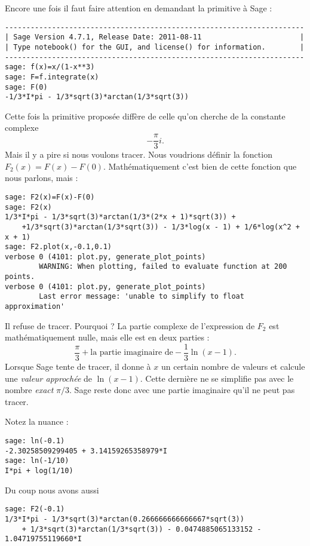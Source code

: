 \begin{example}
	Encore une fois il faut faire attention en demandant la primitive à Sage :
	\begin{verbatim}
----------------------------------------------------------------------
| Sage Version 4.7.1, Release Date: 2011-08-11                       |
| Type notebook() for the GUI, and license() for information.        |
----------------------------------------------------------------------
sage: f(x)=x/(1-x**3)
sage: F=f.integrate(x)
sage: F(0)
-1/3*I*pi - 1/3*sqrt(3)*arctan(1/3*sqrt(3))
\end{verbatim}
	Cette fois la primitive proposée diffère de celle qu'on cherche de la constante complexe
	\begin{equation}
		-\frac{ \pi }{ 3 }i.
	\end{equation}
	Mais il y a pire si nous voulons tracer. Nous voudrions définir la fonction \( F_2(x)=F(x)-F(0)\). Mathématiquement c'est bien de cette fonction que nous parlons, mais :
	\begin{verbatim}
sage: F2(x)=F(x)-F(0)
sage: F2(x)
1/3*I*pi - 1/3*sqrt(3)*arctan(1/3*(2*x + 1)*sqrt(3)) +
    +1/3*sqrt(3)*arctan(1/3*sqrt(3)) - 1/3*log(x - 1) + 1/6*log(x^2 + x + 1)
sage: F2.plot(x,-0.1,0.1)
verbose 0 (4101: plot.py, generate_plot_points) 
        WARNING: When plotting, failed to evaluate function at 200 points.
verbose 0 (4101: plot.py, generate_plot_points) 
        Last error message: 'unable to simplify to float approximation'
\end{verbatim}
	Il refuse de tracer. Pourquoi ? La partie complexe de l'expression de \( F_2\) est mathématiquement nulle, mais elle est en deux parties :
	\begin{equation}
		\frac{ \pi }{ 3 }+\text{la partie imaginaire de} -\frac{1}{ 3 }\ln(x-1).
	\end{equation}
	Lorsque Sage tente de tracer, il donne à \( x\) un certain nombre de valeurs et calcule une \emph{valeur approchée} de \( \ln(x-1)\). Cette dernière ne se simplifie pas avec le nombre \emph{exact} \( \pi/3\). Sage reste donc avec une partie imaginaire qu'il ne peut pas tracer.

	Notez la nuance :
	\begin{verbatim}
sage: ln(-0.1)
-2.30258509299405 + 3.14159265358979*I
sage: ln(-1/10)
I*pi + log(1/10)
\end{verbatim}
	Du coup nous avons aussi
	\begin{verbatim}
sage: F2(-0.1)
1/3*I*pi - 1/3*sqrt(3)*arctan(0.266666666666667*sqrt(3))
    + 1/3*sqrt(3)*arctan(1/3*sqrt(3)) - 0.0474885065133152 - 1.04719755119660*I
\end{verbatim}

\end{example}

